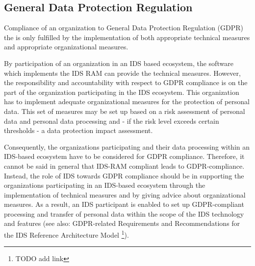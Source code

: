


\subsection{General Data Protection Regulation}
\label{subsec:gdpr}

Compliance of an organization to General Data Protection Regulation (GDPR) the  is only fulfilled by the implementation of both appropriate technical measures and appropriate organizational measures.

By participation of an organization in an IDS based ecosystem, the software which implements the IDS RAM can provide the technical measures. However, the responsibility and accountability with respect to GDPR compliance is on the part of the organization participating in the IDS ecosystem. This organization has to implement adequate organizational measures for the protection of personal data. This set of measures may be set up based on a risk assessment of personal data and personal data processing and - if the risk level exceeds certain thresholds - a data protection impact assessment.

Consequently, the organizations participating and their data processing within an IDS-based ecosystem have to be considered for GDPR compliance. Therefore, it cannot be said in general that IDS-RAM compliant leads to  GDPR-compliance. Instead, the role of IDS towards GDPR compliance should be in supporting the organizations participating in an IDS-based ecosystem through the implementation of technical measures and by giving advice about organizational measures. As a result, an IDS participant is enabled to set up GDPR-compliant processing and transfer of personal data within the scope of the IDS technology and features (see also: GDPR-related Requirements and Recommendations for the IDS Reference Architecture Model \footnote{TODO add link}).






